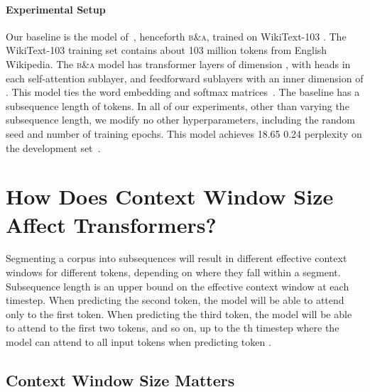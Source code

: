 \documentclass[11pt,a4paper]{article}
\newcommand{\ba}{\textsc{b\&a}\xspace}
\begin{document}
\paragraph{Experimental Setup}
Our baseline is the model of~\citet{baevski}, henceforth \ba, trained on WikiText-103 \citep{pointer}. The WikiText-103 training set contains about 103 million tokens from  English Wikipedia.  The \ba model has  transformer layers of dimension , with  heads in each self-attention sublayer, and feedforward sublayers with an inner dimension of . This model ties the word embedding and softmax matrices~\citep{tying, inan2017}. The baseline has a subsequence length of  tokens.
In all of our experiments, other than varying the subsequence length, we modify no other hyperparameters, including the random seed and number of training epochs. 
This model achieves 18.65  0.24 perplexity on the development set~\cite{sandwich}.  \section{How Does Context Window Size Affect Transformers?}
\label{sec:instance-size-matters}

Segmenting a corpus into subsequences will result in different effective context windows for different tokens, depending on where they fall within a segment.  Subsequence length  is an upper bound on the effective context window at each timestep. 
When predicting the second token, the model will be able to attend only to the first token.
When predicting the third token, the model will be able to attend to the first two tokens, and so on, up to the th timestep where the model can attend to all input tokens when predicting token . 

\subsection{Context Window Size Matters}
\end{document}
